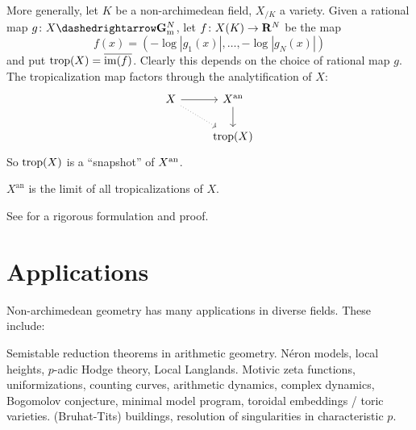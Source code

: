 More generally, let $K$ be a non-archimedean field, $X_{/K}$ a variety. 
Given a rational map $g\colon X\dashedrightarrow \Gm^N$, let 
$f\colon X(K)\to \mathbf{R}^N$ be the map 
\[
  f(x) = (-\log|g_1(x)|,\dots,-\log|g_N(x)|) 
\]
and put $\operatorname{trop}(X) = \overline{\operatorname{im}(f)}$. Clearly this depends on the choice 
of rational map $g$. The tropicalization map factors through the 
analytification of $X$: 
\[
\begin{tikzcd}
  X \ar[r] \ar[dr, dotted]
    & X^\an \ar[d] \\
  & \trop(X)
\end{tikzcd}
\]
So $\operatorname{trop}(X)$ is a ``snapshot'' of $X^{\mathrm{an}}$. 

\begin{theorem_}[Payne]\label{thm:limit-tropicalizations}
$X^\mathrm{an}$ is the limit of all tropicalizations of $X$. 
\end{theorem_}

See \cite{payne-2009} for a rigorous formulation and proof. 





\section{Applications}

Non-archimedean geometry has many applications in diverse fields. These 
include: 

Semistable reduction theorems in arithmetic geometry. N\'eron models, 
local heights, $p$-adic Hodge theory, Local Langlands. Motivic zeta 
functions, uniformizations, counting curves, arithmetic dynamics, 
complex dynamics, Bogomolov conjecture, minimal model program, 
toroidal embeddings / toric varieties. (Bruhat-Tits) buildings, resolution 
of singularities in characteristic $p$. 




